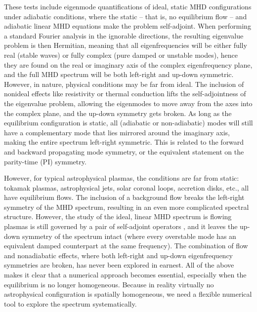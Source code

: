 These tests include eigenmode quantifications of ideal, static MHD configurations under adiabatic conditions, where the static -- that is, no equilibrium flow -- and adiabatic linear MHD equations make the problem self-adjoint. When performing a standard Fourier analysis in the ignorable directions, the resulting eigenvalue problem is then Hermitian, meaning that all eigenfrequencies will be either fully real (stable waves) or fully complex (pure damped or unstable modes), hence they are found on the real or imaginary axis of the complex eigenfrequency plane, and the full MHD spectrum will be both left-right and up-down symmetric. However, in nature, physical conditions may be far from ideal. The inclusion of nonideal effects like resistivity or thermal conduction lifts the self-adjointness of the eigenvalue problem, allowing the eigenmodes to move away from the axes into the complex plane, and the up-down symmetry gets broken. As long as the equilibrium configuration is static, all (adiabatic or non-adiabatic) modes will still have a complementary mode that lies mirrored around the imaginary axis, making the entire spectrum left-right symmetric. This is related to the forward and backward propagating mode symmetry, or the equivalent statement on the parity-time (\gls{PI}) symmetry.

However, for typical astrophysical plasmas, the conditions are far from static: tokamak plasmas, astrophysical jets, solar coronal loops, accretion disks, etc., all have equilibrium flows. The inclusion of a background flow breaks the left-right symmetry of the MHD spectrum, resulting in an even more complicated spectral structure. However, the study of the ideal, linear MHD spectrum is flowing plasmas is still governed by a pair of self-adjoint operators \citep{goedbloed2011,book_MHD}, and it leaves the up-down symmetry of the spectrum intact (where every overstable mode has an equivalent damped counterpart at the same frequency). The combination of flow and nonadiabatic effects, where both left-right and up-down eigenfrequency symmetries are broken, has never been explored in earnest. All of the above makes it clear that a numerical approach becomes essential, especially when the equilibrium is no longer homogeneous. Because in reality virtually no astrophysical configuration is spatially homogeneous, we need a flexible numerical tool to explore the spectrum systematically.

